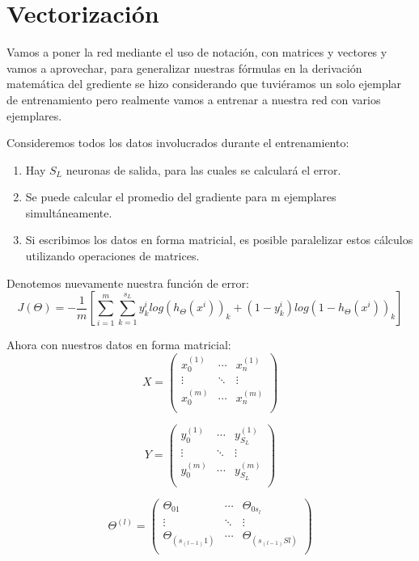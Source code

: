 \section{Vectorización}
Vamos a poner la red mediante el uso de notación, con matrices y vectores y vamos a aprovechar, para generalizar nuestras fórmulas en la derivación matemática del grediente se hizo considerando que tuviéramos un solo ejemplar de entrenamiento pero realmente vamos a entrenar a nuestra red con varios ejemplares. 

Consideremos todos los datos involucrados durante el entrenamiento:
\begin{enumerate}
 \item Hay $S_{L}$ neuronas de salida, para las cuales se calculará el error.
 \item Se puede calcular el promedio del gradiente para m ejemplares simultáneamente.
 \item Si escribimos los datos en forma matricial, es posible paralelizar estos cálculos utilizando operaciones de matrices.
\end{enumerate}
Denotemos nuevamente nuestra función de error:
 \begin{equation}
  J (\Theta) = -\dfrac{1}{m}\left[\sum_{i=1}^{m}\sum_{k=1}^{s_{L}}y_{k}^{i} log( h_{\Theta}(x^i))_{k}+(1-y_{k}^{i})log(1- h_{\Theta}(x^i))_{k}  \right]  
 \end{equation}

Ahora con nuestros datos en forma matricial:
\begin{equation}
X = 
\begin{pmatrix}
x_{0}^{(1)} & \cdots & x_{n}^{(1)}\\
\vdots & \ddots & \vdots\\
x_{0}^{(m)} & \cdots & x_{n}^{(m)}\\
\end{pmatrix}
\end{equation}


\begin{equation}
Y = 
\begin{pmatrix}
y_{0}^{(1)} & \cdots & y_{S_{L}}^{(1)}\\
\vdots & \ddots & \vdots\\
y_{0}^{(m)} & \cdots & y_{S_{L}}^{(m)}\\
\end{pmatrix}
\end{equation}


\begin{equation}
\Theta^{(l)} = 
\begin{pmatrix}
\Theta_{01} & \cdots & \Theta_{0s_{l}}\\
\vdots & \ddots & \vdots\\
\Theta_{(s_{(l-1)}1)} & \cdots & \Theta_{(s_{(l-1)}Sl)}\\
\end{pmatrix}
\end{equation}

